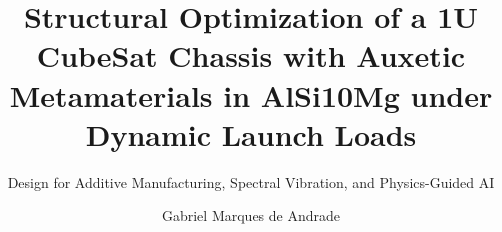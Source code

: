 \documentclass[graybox,envcountchap,sectrefs]{SNmono}
\begin{document}
\author{Gabriel Marques de Andrade}
\title{Structural Optimization of a 1U CubeSat Chassis with Auxetic Metamaterials in AlSi10Mg under Dynamic Launch Loads}
\subtitle{Design for Additive Manufacturing, Spectral Vibration, and Physics-Guided AI}
\maketitle

\frontmatter%






\tableofcontents



\mainmatter%








\backmatter%







\printindex
\end{document}
